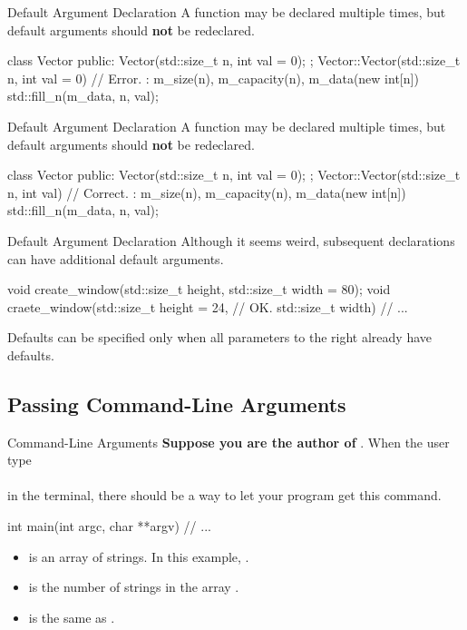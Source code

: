 \documentclass{beamer}
\begin{document}
\begin{frame}[fragile]{Default Argument Declaration}
    A function may be declared multiple times, but default arguments should \textbf{not} be redeclared.
    \begin{cpp}
class Vector {
 public:
  Vector(std::size_t n, int val = 0);
};
Vector::Vector(std::size_t n, int val = 0) // Error.
    : m_size(n), m_capacity(n), m_data(new int[n]{}) {
  std::fill_n(m_data, n, val);
}
    \end{cpp}
\end{frame}

\begin{frame}[fragile]{Default Argument Declaration}
    A function may be declared multiple times, but default arguments should \textbf{not} be redeclared. 
    \begin{cpp}
class Vector {
 public:
  Vector(std::size_t n, int val = 0);
};
Vector::Vector(std::size_t n, int val) // Correct.
    : m_size(n), m_capacity(n), m_data(new int[n]{}) {
  std::fill_n(m_data, n, val);
}
    \end{cpp}
\end{frame}

\begin{frame}[fragile]{Default Argument Declaration}
    Although it seems weird, subsequent declarations can have additional default arguments.
    \begin{cpp}
void create_window(std::size_t height,
                   std::size_t width = 80);
void craete_window(std::size_t height = 24, // OK.
                   std::size_t width) {
  // ...
}
    \end{cpp}
    Defaults can be specified only when all parameters to the right already have defaults.
\end{frame}

\subsection{Passing Command-Line Arguments}

\begin{frame}[fragile]{Command-Line Arguments}
    \textbf{Suppose you are the author of }. When the user type\\
    \\
    in the terminal, there should be a way to let your program get this command.
    \pause
    \begin{cpp}
int main(int argc, char **argv) {
  // ...
}
    \end{cpp}
    \begin{itemize}
        \item {} is an array of strings. In this example, .
        \item {} is the number of strings in the array .
        \item {} is the same as .
    \end{itemize}
\end{frame}
\end{document}
